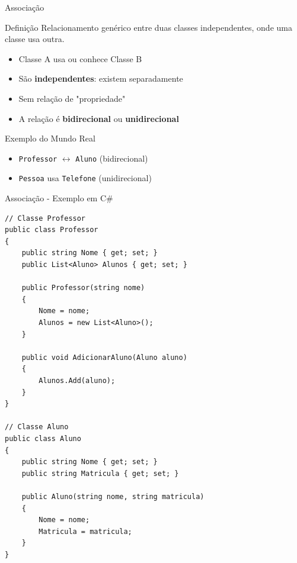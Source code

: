 \documentclass[aspectratio=169]{beamer}
\begin{document}
\begin{frame}{Associação}
\begin{block}{Definição}
Relacionamento genérico entre duas classes independentes, onde uma classe usa outra.
\end{block}

\begin{itemize}
\item Classe A usa ou conhece Classe B
\item São \textbf{independentes}: existem separadamente
\item Sem relação de "propriedade"
\item A relação é \textbf{bidirecional} ou \textbf{unidirecional}
\end{itemize}

\vspace{0.5cm}
\begin{exampleblock}{Exemplo do Mundo Real}
\begin{itemize}
\item \texttt{Professor} $\leftrightarrow$ \texttt{Aluno} (bidirecional)
\item \texttt{Pessoa} usa \texttt{Telefone} (unidirecional)
\end{itemize}
\end{exampleblock}
\end{frame}

\begin{frame}{Associação - Exemplo em C\#}
\begin{lstlisting}
// Classe Professor
public class Professor
{
    public string Nome { get; set; }
    public List<Aluno> Alunos { get; set; }
    
    public Professor(string nome)
    {
        Nome = nome;
        Alunos = new List<Aluno>();
    }
    
    public void AdicionarAluno(Aluno aluno)
    {
        Alunos.Add(aluno);
    }
}

// Classe Aluno
public class Aluno
{
    public string Nome { get; set; }
    public string Matricula { get; set; }
    
    public Aluno(string nome, string matricula)
    {
        Nome = nome;
        Matricula = matricula;
    }
}
\end{lstlisting}
\end{frame}
\end{document}
